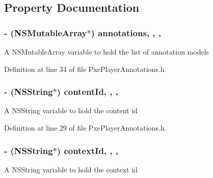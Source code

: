 \subsection{Property Documentation}
\hypertarget{interface_pxe_player_annotations_a5ae9bd632e977e680f9093f2964d1cc9}{
\subsubsection[{annotations}]{\setlength{\rightskip}{0pt plus 5cm}-\/ (N\-S\-Mutable\-Array$\ast$) annotations\hspace{0.3cm}{\ttfamily [read]}, {\ttfamily [write]}, {\ttfamily [nonatomic]}, {\ttfamily [strong]}}}\label{interface_pxe_player_annotations_a5ae9bd632e977e680f9093f2964d1cc9}
A N\-S\-Mutable\-Array variable to hold the list of annotation models 

Definition at line 34 of file Pxe\-Player\-Annotations.\-h.

\hypertarget{interface_pxe_player_annotations_a84faed2ddf241cbf964d77750c508aab}{
\subsubsection[{content\-Id}]{\setlength{\rightskip}{0pt plus 5cm}-\/ (N\-S\-String$\ast$) content\-Id\hspace{0.3cm}{\ttfamily [read]}, {\ttfamily [write]}, {\ttfamily [nonatomic]}, {\ttfamily [strong]}}}\label{interface_pxe_player_annotations_a84faed2ddf241cbf964d77750c508aab}
A N\-S\-String variable to hold the content id 

Definition at line 29 of file Pxe\-Player\-Annotations.\-h.

\hypertarget{interface_pxe_player_annotations_a038286be287dfb0f38f292e3b5ee99aa}{
\subsubsection[{context\-Id}]{\setlength{\rightskip}{0pt plus 5cm}-\/ (N\-S\-String$\ast$) context\-Id\hspace{0.3cm}{\ttfamily [read]}, {\ttfamily [write]}, {\ttfamily [nonatomic]}, {\ttfamily [strong]}}}\label{interface_pxe_player_annotations_a038286be287dfb0f38f292e3b5ee99aa}
A N\-S\-String variable to hold the context id 

